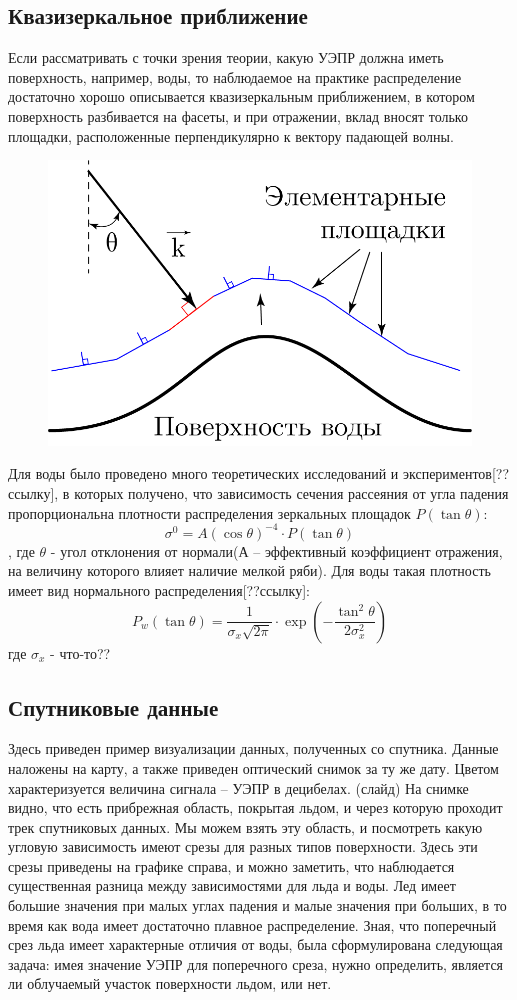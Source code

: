 \subsection{Квазизеркальное приближение}
Если рассматривать с точки зрения теории, какую УЭПР должна иметь поверхность, например, воды, то наблюдаемое на
практике распределение достаточно хорошо описывается квазизеркальным приближением, в котором поверхность разбивается на
фасеты, и при отражении, вклад вносят только площадки, расположенные перпендикулярно к вектору падающей волны.


\begin{figure}[h!]
  \centering
  \includegraphics[width = .45\linewidth]{img/kvaz.png}
  \caption{}
  \label{fig:2}
\end{figure}
Для воды было проведено много теоретических исследований и экспериментов[??ссылку], в которых получено, что зависимость сечения рассеяния
от угла падения пропорциональна плотности распределения зеркальных площадок $P(\tan \theta)$:
\begin{equation}
  \sigma^0 = A (\cos \theta)^{-4} \cdot P(\tan \theta)
  \label{eq:3}
\end{equation}
, где $\theta$ - угол отклонения от нормали(А – эффективный коэффициент отражения, на величину которого влияет наличие
мелкой ряби). Для воды такая плотность имеет вид нормального распределения[??ссылку]:
\begin{equation}
  P_w(\tan \theta) = \frac{1}{\sigma_x \sqrt{2 \pi}} \cdot \exp (- \frac{\tan^2\theta}{2 \sigma^2_x})
  \label{eq:4}
\end{equation}
где $\sigma_x$ - что-то??

\subsection{Спутниковые данные}
Здесь приведен пример визуализации данных, полученных со спутника. Данные наложены на карту, а также приведен оптический
снимок за ту же дату. Цветом характеризуется величина сигнала – УЭПР в децибелах. (слайд) На снимке видно, что есть
прибрежная область, покрытая льдом, и через которую проходит трек спутниковых данных.
Мы можем взять эту область, и посмотреть какую угловую зависимость имеют срезы для разных типов поверхности. Здесь эти
срезы приведены на графике справа, и можно заметить, что наблюдается существенная разница между зависимостями для льда и
воды. Лед имеет большие значения при малых углах падения и малые значения при больших, в то время как вода имеет
достаточно плавное распределение. 
Зная, что поперечный срез льда имеет характерные отличия от воды, была сформулирована следующая задача: имея значение
УЭПР для поперечного среза, нужно определить, является ли облучаемый участок поверхности льдом, или нет.

